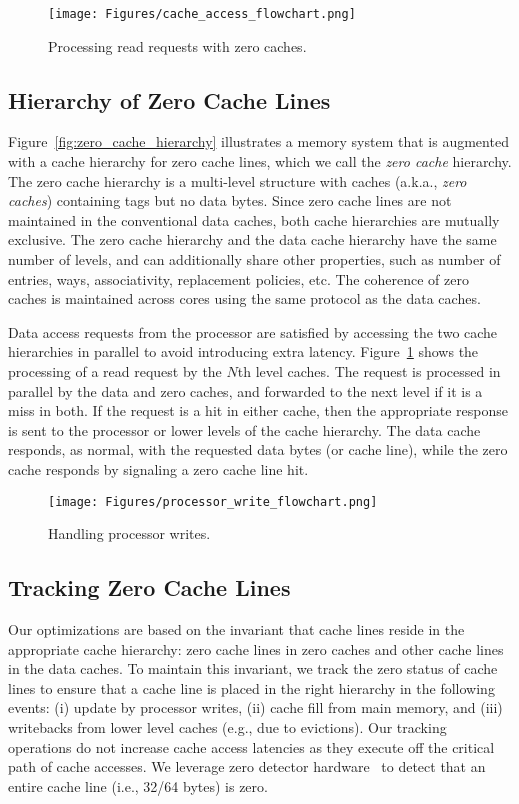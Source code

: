 \begin{figure}[!t]
\centering
\texttt{[image: Figures/cache\_access\_flowchart.png]}
\caption{Processing read requests with zero caches.}
\label{fig:cache_access_flowchart}
\end{figure}

\subsection{Hierarchy of Zero Cache Lines}

Figure~\ref{fig:zero_cache_hierarchy} illustrates a memory system that is augmented with a cache hierarchy for zero cache lines, which we call the \emph{zero cache} hierarchy. The zero cache hierarchy is a multi-level structure with caches (a.k.a., \emph{zero caches}) containing tags but no data bytes.  Since zero cache lines are not maintained in the conventional data caches, both cache hierarchies are mutually exclusive. The zero cache hierarchy and the data cache hierarchy have the same number of levels, and can additionally share other properties, such as number of entries, ways, associativity, replacement policies, etc.  The coherence of zero caches is maintained across cores using the same protocol as the data caches. 

Data access requests from the processor are satisfied by accessing the two cache hierarchies in parallel to avoid introducing extra latency. Figure~\ref{fig:cache_access_flowchart} shows the processing of a read request by the $N$th level caches.  The request is processed in parallel by the data  and zero caches, and forwarded to the next level if it is a miss in both.  If the request is a hit in either cache, then the appropriate response is sent to the processor or lower levels of the cache hierarchy.   The data cache responds, as normal, with the requested data bytes (or cache line), while the zero cache responds by signaling a zero cache line hit. 

\begin{figure}[!t]
\centering
\texttt{[image: Figures/processor\_write\_flowchart.png]}
\caption{Handling processor writes.}
\label{fig:processor_write_flowchart}
\end{figure}

\subsection{Tracking Zero Cache Lines}

Our optimizations are based on the invariant that cache lines reside in the appropriate cache hierarchy: zero cache lines in zero caches and other cache lines in the data caches. To maintain this invariant, we track the zero status of cache lines to ensure that a cache line is placed in the right hierarchy in the following events: (i) update by processor writes, (ii) cache fill from main memory, and (iii) writebacks from lower level caches (e.g., due to evictions). Our tracking operations do not increase cache access latencies as they execute off the critical path of cache accesses. We leverage zero detector hardware~\cite{Dusser09} to detect that an entire cache line (i.e., 32/64 bytes) is zero.

